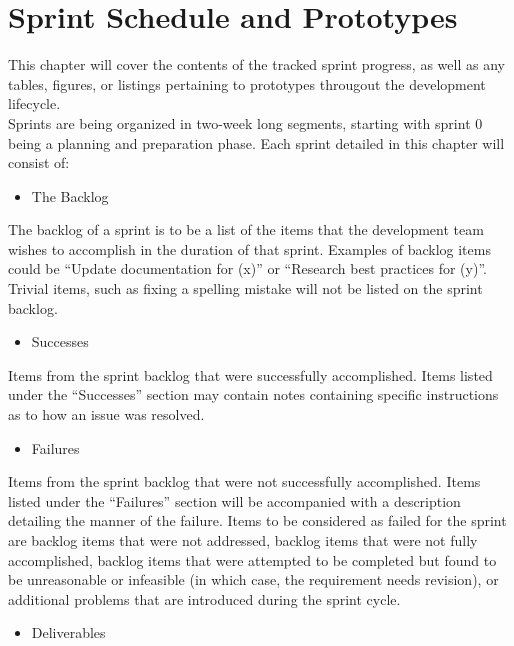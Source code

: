 
\chapter{Sprint Schedule and Prototypes}    
    \hspace{7mm}This chapter will cover the contents of the tracked sprint progress, as well as any tables, figures, or listings
    pertaining to prototypes througout the development lifecycle.\\

    Sprints are being organized in two-week long segments, starting with sprint 0 being a planning and preparation phase.
    Each sprint detailed in this chapter will consist of:
    \begin{itemize} \item The Backlog \end{itemize}
    
        The backlog of a sprint is to be a list of the items that the development team wishes to accomplish in the duration
        of that sprint. Examples of backlog items could be ``Update documentation for (x)'' or ``Research best practices for (y)''.
        Trivial items, such as fixing a spelling mistake will not be listed on the sprint backlog.\\

    \begin{itemize} \item Successes \end{itemize}
        
        Items from the sprint backlog that were successfully accomplished.  Items listed under the ``Successes'' section
        may contain notes containing specific instructions as to how an issue was resolved.\\

    \begin{itemize} \item Failures \end{itemize}
        
        Items from the sprint backlog that were not successfully accomplished.  Items listed under the ``Failures'' section
        will be accompanied with a description detailing the manner of the failure.  Items to be considered as failed for the
        sprint are backlog items that were not addressed, backlog items that were not fully accomplished, backlog items that
        were attempted to be completed but found to be unreasonable or infeasible (in which case, the requirement needs revision),
        or additional problems that are introduced during the sprint cycle.\\
    \begin{itemize} \item Deliverables \end{itemize}
        
